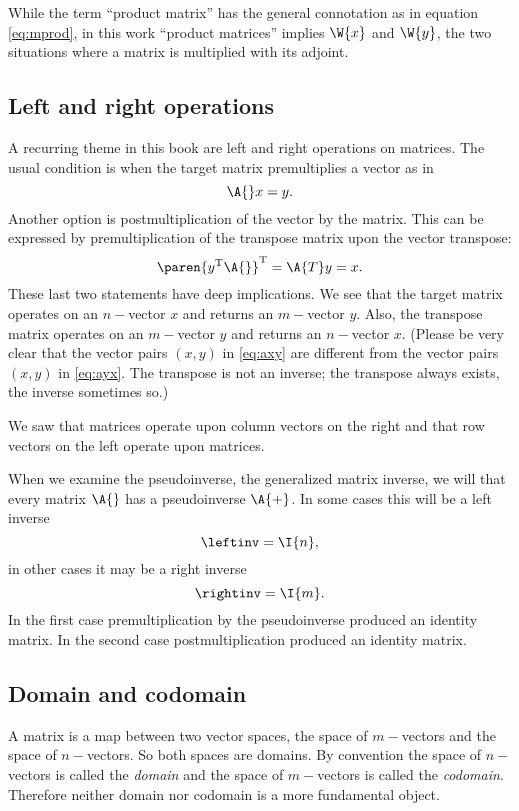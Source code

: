 While the term ``product matrix'' has the general connotation as in equation \eqref{eq:mprod}, in this work ``product matrices'' implies $\W{x}$ and $\W{y}$, the two situations where a matrix is multiplied with its adjoint.

\subsection{Left and right operations}
A recurring theme in this book are left and right operations on matrices. 
The usual condition is when the target matrix premultiplies a vector as in 
\begin{equation}
\A{}x=y.
\label{eq:axy}
\end{equation}
Another option is postmultiplication of the vector by the matrix. This can be expressed by premultiplication of the transpose matrix upon the vector transpose:
\begin{equation}
  \paren{y^{\mathrm{T}}\A{}}^{\mathrm{T}} = \A{T}y=x.
\label{eq:ayx}
\end{equation}
These last two statements have deep implications. We see that the target matrix operates on an $n-$vector $x$ and returns an $m-$vector $y$. Also, the transpose matrix operates on an $m-$vector $y$ and returns an $n-$vector $x$. (Please be very clear that the vector pairs $(x,y)$ in \eqref{eq:axy} are different from the vector pairs $(x,y)$ in \eqref{eq:ayx}. The transpose is not an inverse; the transpose always exists, the inverse sometimes so.)

We saw that matrices operate upon column vectors on the right and that row vectors on the left operate upon matrices.

When we examine the pseudoinverse, the generalized matrix inverse, we will that every matrix $\A{}$ has a pseudoinverse $\A{+}$. In some cases this will be a left inverse
\begin{equation}
  \leftinv = \I{n},
\end{equation}
in other cases it may be a right inverse
\begin{equation}
  \rightinv = \I{m}.
\end{equation}
In the first case premultiplication by the pseudoinverse produced an identity matrix. In the second case postmultiplication produced an identity matrix.

\subsection{Domain and codomain}
A matrix is a map between two vector spaces, the space of $m-$vectors and the space of $n-$vectors. So both spaces are domains. By convention the space of $n-$vectors is called the \textit{domain} and the space of $m-$vectors is called the \textit{codomain}. Therefore neither domain nor codomain is a more fundamental object.

